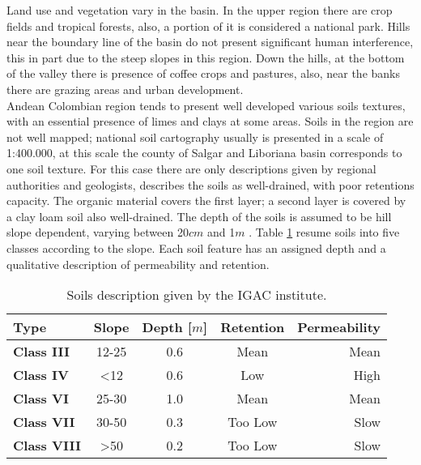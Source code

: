 {Land use and vegetation vary in the basin. In the upper region there are crop fields and tropical forests, also, a portion of it is considered a national park.  Hills near the boundary line of the basin do not present significant human interference, this in part due to the steep slopes in this region.  Down the hills, at the bottom of the valley there is presence of coffee crops and pastures, also, near the banks there are grazing areas and urban development.\\

Andean Colombian region tends to present well developed various soils textures, with an essential presence of limes and clays at some areas.  Soils in the region are not well mapped; national soil cartography usually is presented in a scale of 1:400.000, at this scale the county of Salgar and Liboriana basin corresponds to one soil texture. For this case there are only descriptions given by regional authorities and geologists, \citet{Osorio2008} describes the soils as well-drained, with poor retentions capacity. The organic material covers the first layer; a second layer is covered by a clay loam soil also well-drained.  The depth of the soils is assumed to be hill slope dependent, varying between 20$cm$ and 1$m$ \citep{Osorio2008}. Table \ref{tab:suelos} resume soils into five classes according to the slope. Each soil feature has an assigned depth and a qualitative description of permeability and retention.\\

\begin{table}[t]
  \caption{Soils description given by the IGAC institute.}
  \begin{tabular}{lcccr}
  \hline
    \textbf{Type} & \textbf{Slope} & \textbf{Depth [$m$]} & \textbf{Retention} & \textbf{Permeability} \\    
  \hline
    \textbf{Class III} & 12-25 & 0.6 & Mean & Mean \\
    \textbf{Class IV} & <12 & 0.6 & Low & High \\
    \textbf{Class VI} & 25-30 & 1.0 & Mean & Mean \\
    \textbf{Class VII} & 30-50 & 0.3 & Too Low & Slow \\
    \textbf{Class VIII} & >50 & 0.2 & Too Low & Slow \\
  \hline
  \end{tabular}
  \label{tab:suelos}
\end{table}

}

